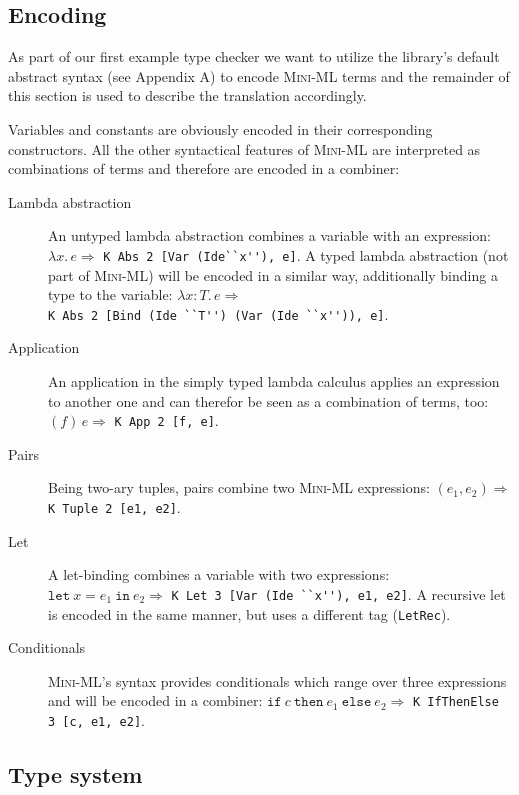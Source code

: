 \subsection{Encoding}

As part of our first example type checker we want to utilize the
library's default abstract syntax (see Appendix A) to encode
\textsc{Mini-ML} terms and the remainder of this section is used to
describe the translation accordingly.

\bigskip

Variables and constants are obviously encoded in their corresponding
constructors. All the other syntactical features of \textsc{Mini-ML}
are interpreted as combinations of terms and therefore are encoded in
a combiner:

\begin{description}
\item[Lambda abstraction] An untyped lambda abstraction combines a
  variable with an expression: $\lambda x.\, e \Rightarrow$
  \verb|K Abs 2 [Var (Ide``x''), e]|.  A typed lambda abstraction (not
  part of \textsc{Mini-ML}) will be encoded in a similar way,
  additionally binding a type to the variable: $\lambda x:T.\, e
  \Rightarrow$\\ \verb|K Abs 2 [Bind (Ide ``T'') (Var (Ide ``x'')), e]|.
\item[Application] An application in the simply typed lambda calculus
  applies an expression to another one and can therefor be seen as a
  combination of terms, too: $(f)\, e \Rightarrow$ \verb|K App 2 [f, e]|.
\item[Pairs] Being two-ary tuples, pairs combine two \textsc{Mini-ML}
  expressions: $(e_{1},e_{2}) \Rightarrow$ \verb|K Tuple 2 [e1, e2]|.
\item[Let] A let-binding combines a variable with two expressions:
  $\mathtt{let}\ x = e_{1}\ \mathtt{in}\ e_{2} \Rightarrow$
  \verb|K Let 3 [Var (Ide ``x''), e1, e2]|.  A recursive let is
  encoded in the same manner, but uses a different tag
  (\texttt{LetRec}).
\item[Conditionals] \textsc{Mini-ML}'s syntax provides conditionals
  which range over three expressions and will be encoded in a
  combiner: $\mathtt{if}\ c\ \mathtt{then}\ e_{1}\ \mathtt{else}\
  e_{2} \Rightarrow$ \verb|K IfThenElse 3 [c, e1, e2]|.
\end{description}

\subsection{Type system}

